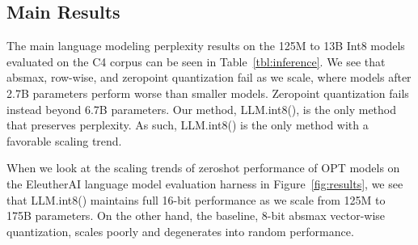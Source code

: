 \documentclass{article}
\begin{document}
\subsection{Main Results}

The main language modeling perplexity results on the 125M to 13B Int8 models evaluated on the C4 corpus can be seen in Table~\ref{tbl:inference}. We see that absmax, row-wise, and zeropoint quantization fail as we scale, where models after 2.7B parameters perform worse than smaller models. Zeropoint quantization fails instead beyond 6.7B parameters. Our method, LLM.int8(), is the only method that preserves perplexity. As such, LLM.int8() is the only method with a favorable scaling trend.

When we look at the scaling trends of zeroshot performance of OPT models on the EleutherAI language model evaluation harness in Figure~\ref{fig:results}, we see that LLM.int8() maintains full 16-bit performance as we scale from 125M to 175B parameters. On the other hand, the baseline, 8-bit absmax vector-wise quantization, scales poorly and degenerates into random performance.
\end{document}
